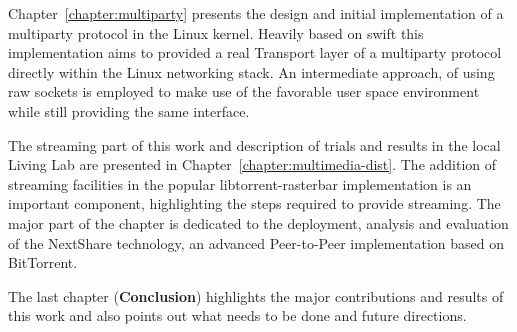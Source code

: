 Chapter~\ref{chapter:multiparty} presents the design and initial
implementation of a multiparty protocol in the Linux kernel. Heavily based on
swift this implementation aims to provided a real Transport layer of a
multiparty protocol directly within the Linux networking stack. An
intermediate approach, of using raw sockets is employed to make use of the
favorable user space environment while still providing the same interface.

The streaming part of this work and description of trials and results in the
local Living Lab are presented in Chapter~\ref{chapter:multimedia-dist}. The
addition of streaming facilities in the popular libtorrent-rasterbar
implementation is an important component, highlighting the steps required to
provide streaming. The major part of the chapter is dedicated to the
deployment, analysis and evaluation of the NextShare technology, an advanced
Peer-to-Peer implementation based on BitTorrent.

The last chapter (\textbf{Conclusion}) highlights the major contributions and
results of this work and also points out what needs to be done and future
directions.
